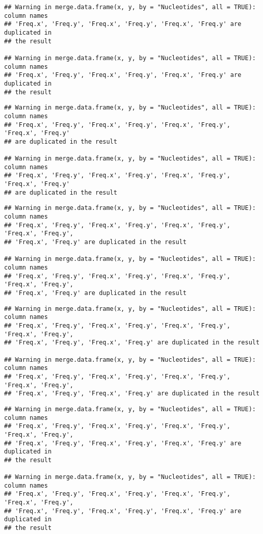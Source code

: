 \documentclass[
]{article}
\begin{document}
\begin{verbatim}
## Warning in merge.data.frame(x, y, by = "Nucleotides", all = TRUE): column names
## 'Freq.x', 'Freq.y', 'Freq.x', 'Freq.y', 'Freq.x', 'Freq.y' are duplicated in
## the result

## Warning in merge.data.frame(x, y, by = "Nucleotides", all = TRUE): column names
## 'Freq.x', 'Freq.y', 'Freq.x', 'Freq.y', 'Freq.x', 'Freq.y' are duplicated in
## the result
\end{verbatim}

\begin{verbatim}
## Warning in merge.data.frame(x, y, by = "Nucleotides", all = TRUE): column names
## 'Freq.x', 'Freq.y', 'Freq.x', 'Freq.y', 'Freq.x', 'Freq.y', 'Freq.x', 'Freq.y'
## are duplicated in the result

## Warning in merge.data.frame(x, y, by = "Nucleotides", all = TRUE): column names
## 'Freq.x', 'Freq.y', 'Freq.x', 'Freq.y', 'Freq.x', 'Freq.y', 'Freq.x', 'Freq.y'
## are duplicated in the result
\end{verbatim}

\begin{verbatim}
## Warning in merge.data.frame(x, y, by = "Nucleotides", all = TRUE): column names
## 'Freq.x', 'Freq.y', 'Freq.x', 'Freq.y', 'Freq.x', 'Freq.y', 'Freq.x', 'Freq.y',
## 'Freq.x', 'Freq.y' are duplicated in the result

## Warning in merge.data.frame(x, y, by = "Nucleotides", all = TRUE): column names
## 'Freq.x', 'Freq.y', 'Freq.x', 'Freq.y', 'Freq.x', 'Freq.y', 'Freq.x', 'Freq.y',
## 'Freq.x', 'Freq.y' are duplicated in the result
\end{verbatim}

\begin{verbatim}
## Warning in merge.data.frame(x, y, by = "Nucleotides", all = TRUE): column names
## 'Freq.x', 'Freq.y', 'Freq.x', 'Freq.y', 'Freq.x', 'Freq.y', 'Freq.x', 'Freq.y',
## 'Freq.x', 'Freq.y', 'Freq.x', 'Freq.y' are duplicated in the result

## Warning in merge.data.frame(x, y, by = "Nucleotides", all = TRUE): column names
## 'Freq.x', 'Freq.y', 'Freq.x', 'Freq.y', 'Freq.x', 'Freq.y', 'Freq.x', 'Freq.y',
## 'Freq.x', 'Freq.y', 'Freq.x', 'Freq.y' are duplicated in the result
\end{verbatim}

\begin{verbatim}
## Warning in merge.data.frame(x, y, by = "Nucleotides", all = TRUE): column names
## 'Freq.x', 'Freq.y', 'Freq.x', 'Freq.y', 'Freq.x', 'Freq.y', 'Freq.x', 'Freq.y',
## 'Freq.x', 'Freq.y', 'Freq.x', 'Freq.y', 'Freq.x', 'Freq.y' are duplicated in
## the result

## Warning in merge.data.frame(x, y, by = "Nucleotides", all = TRUE): column names
## 'Freq.x', 'Freq.y', 'Freq.x', 'Freq.y', 'Freq.x', 'Freq.y', 'Freq.x', 'Freq.y',
## 'Freq.x', 'Freq.y', 'Freq.x', 'Freq.y', 'Freq.x', 'Freq.y' are duplicated in
## the result
\end{verbatim}
\end{document}
